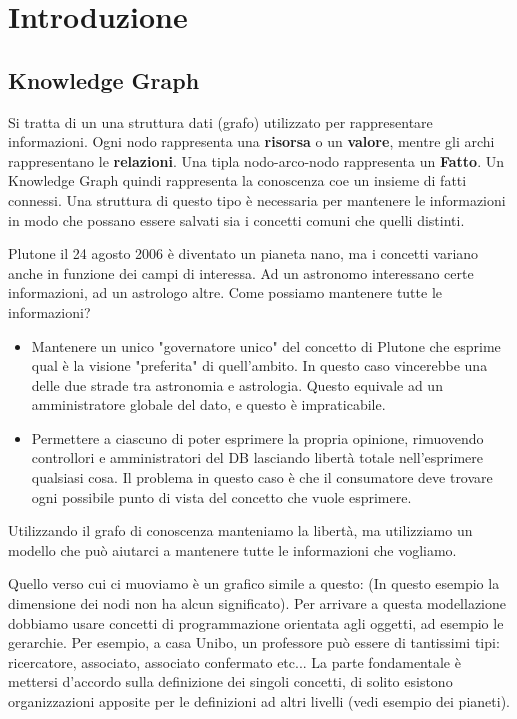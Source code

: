 \section{Introduzione}
\subsection{Knowledge Graph}
Si tratta di un una struttura dati (grafo) utilizzato per rappresentare informazioni. Ogni nodo rappresenta una \textbf{risorsa} o un \textbf{valore}, mentre gli archi rappresentano le \textbf{relazioni}.\newline
Una tipla nodo-arco-nodo rappresenta un \textbf{Fatto}. Un Knowledge Graph quindi rappresenta la conoscenza coe un insieme di fatti connessi. Una struttura di questo tipo è necessaria per mantenere le informazioni in modo che possano essere salvati sia i concetti comuni che quelli distinti.
\begin{info}[Esempio]
	Plutone il 24 agosto 2006 è diventato un pianeta nano, ma i concetti variano anche in funzione dei campi di interessa. Ad un astronomo interessano certe informazioni, ad un astrologo altre. Come possiamo mantenere tutte le informazioni?
	\begin{itemize}
		\item Mantenere un unico "governatore unico" del concetto di Plutone che esprime qual è la visione "preferita" di quell'ambito. In questo caso vincerebbe una delle due strade tra astronomia e astrologia. Questo equivale ad un amministratore globale del dato, e questo è impraticabile.
		\item Permettere a ciascuno di poter esprimere la propria opinione, rimuovendo controllori e amministratori del DB lasciando libertà totale nell'esprimere qualsiasi cosa. Il problema in questo caso è che il consumatore deve trovare ogni possibile punto di vista del concetto che vuole esprimere.
	\end{itemize}
	Utilizzando il grafo di conoscenza manteniamo la libertà, ma utilizziamo un modello che può aiutarci a mantenere tutte le informazioni che vogliamo.
\end{info}
Quello verso cui ci muoviamo è un grafico simile a questo:
(In questo esempio la dimensione dei nodi non ha alcun significato).\newline
Per arrivare a questa modellazione dobbiamo usare concetti di programmazione orientata agli oggetti, ad esempio le gerarchie.\newline
Per esempio, a casa Unibo, un professore può essere di tantissimi tipi: ricercatore, associato, associato confermato etc...\newline
La parte fondamentale è mettersi d'accordo sulla definizione dei singoli concetti, di solito esistono organizzazioni apposite per le definizioni ad altri livelli (vedi esempio dei pianeti).\newline

